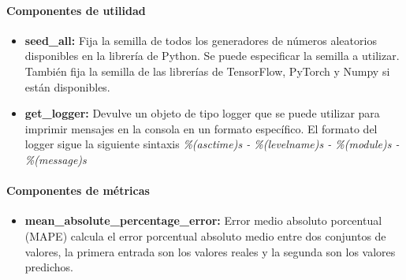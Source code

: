 \paragraph{Componentes de utilidad}
\begin{itemize}
    \item \textbf{seed\_all:} Fija la semilla de todos los generadores de números aleatorios
    disponibles en la librería de Python. Se puede especificar la semilla a utilizar. También
    fija la semilla de las librerías de TensorFlow, PyTorch y Numpy si están disponibles.
    \item \textbf{get\_logger:} Devulve un objeto de tipo logger que se puede utilizar para
    imprimir mensajes en la consola en un formato específico. El formato del logger sigue la
    siguiente sintaxis \textit{\%(asctime)s - \%(levelname)s - \%(module)s - \%(message)s} 
\end{itemize} 

\paragraph{Componentes de métricas}
\begin{itemize}
    \item \textbf{mean\_absolute\_percentage\_error:} Error medio absoluto porcentual (MAPE) 
    calcula el error porcentual absoluto medio entre dos conjuntos de valores, la primera 
    entrada son los valores reales y la segunda son los valores predichos.
\end{itemize}